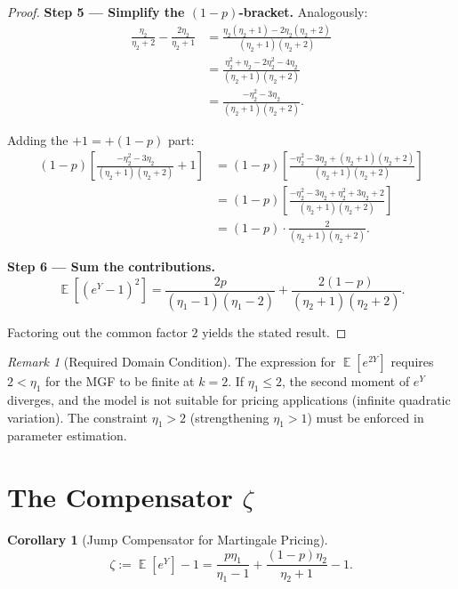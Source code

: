 \documentclass[11pt,a4paper,openany]{book}
\theoremstyle{definition}
\theoremstyle{plain}
\newtheorem{corollary}[theorem]{Corollary}
\theoremstyle{remark}
\newtheorem{remark}[theorem]{Remark}
\DeclareMathOperator{\E}{\mathbb{E}}
\newcommand{\1}{\mathbbm{1}}
\begin{document}
\begin{proof}
\textbf{Step 5 --- Simplify the $(1-p)$-bracket.} Analogously:
\[
\begin{aligned}
\frac{\eta_{2}}{\eta_{2} + 2} - \frac{2\eta_{2}}{\eta_{2} + 1}
&= \frac{\eta_{2}(\eta_{2} + 1) - 2\eta_{2}(\eta_{2} + 2)}{(\eta_{2} + 1)(\eta_{2} + 2)} \\
&= \frac{\eta_{2}^{2} + \eta_{2} - 2\eta_{2}^{2} - 4\eta_{2}}{(\eta_{2} + 1)(\eta_{2} + 2)} \\
&= \frac{-\eta_{2}^{2} - 3\eta_{2}}{(\eta_{2} + 1)(\eta_{2} + 2)}.
\end{aligned}
\]

Adding the $+1 = +(1-p)$ part:
\[
\begin{aligned}
(1-p)\left[ \frac{-\eta_{2}^{2} - 3\eta_{2}}{(\eta_{2} + 1)(\eta_{2} + 2)} + 1 \right]
&= (1-p)\left[ \frac{-\eta_{2}^{2} - 3\eta_{2} + (\eta_{2} + 1)(\eta_{2} + 2)}{(\eta_{2} + 1)(\eta_{2} + 2)} \right] \\
&= (1-p)\left[ \frac{-\eta_{2}^{2} - 3\eta_{2} + \eta_{2}^{2} + 3\eta_{2} + 2}{(\eta_{2} + 1)(\eta_{2} + 2)} \right] \\
&= (1-p) \cdot \frac{2}{(\eta_{2} + 1)(\eta_{2} + 2)}.
\end{aligned}
\]

\textbf{Step 6 --- Sum the contributions.}
\[
\E[(e^{Y} - 1)^{2}] = \frac{2p}{(\eta_{1} - 1)(\eta_{1} - 2)} + \frac{2(1-p)}{(\eta_{2} + 1)(\eta_{2} + 2)}.
\]

Factoring out the common factor $2$ yields the stated result.
\end{proof}

\begin{remark}[Required Domain Condition]
The expression for $\E[e^{2Y}]$ requires $2 < \eta_{1}$ for the MGF to be finite at $k=2$. If $\eta_{1} \leq 2$, the second moment of $e^{Y}$ diverges, and the model is not suitable for pricing applications (infinite quadratic variation). The constraint $\eta_{1} > 2$ (strengthening $\eta_{1} > 1$) must be enforced in parameter estimation.
\end{remark}

\section{The Compensator $\zeta$}

\begin{corollary}[Jump Compensator for Martingale Pricing]
\[
\zeta := \E[e^{Y}] - 1 = \frac{p\eta_{1}}{\eta_{1} - 1} + \frac{(1-p)\eta_{2}}{\eta_{2} + 1} - 1.
\]
\end{corollary}
\end{document}
